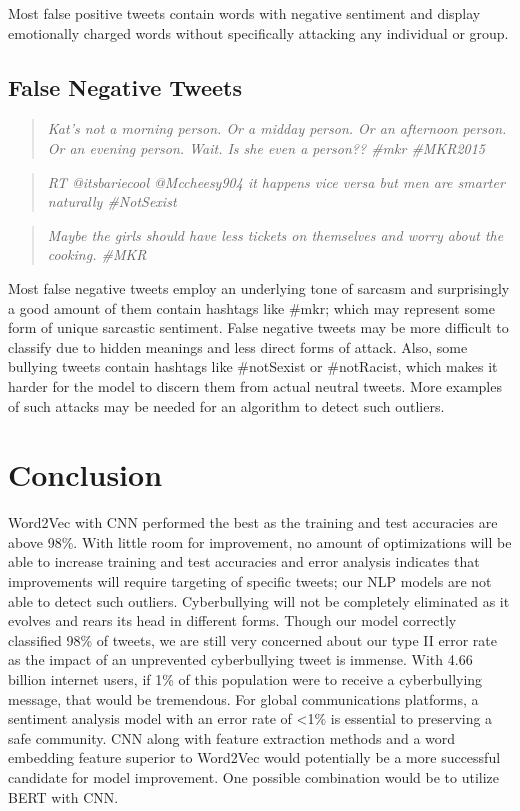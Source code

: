 \documentclass[conference]{IEEEtran}
\begin{document}
Most false positive tweets contain words with negative sentiment and display emotionally charged words without specifically attacking any individual or group.

\subsection{False Negative Tweets}
\begin{quotation}
\emph{Kat's not a morning person. Or a midday person. Or an afternoon person. Or an evening person. Wait. Is she even a person??  \#mkr \#MKR2015}
\end{quotation}
\begin{quotation}
\emph{RT @itsbariecool @Mccheesy904 it happens vice versa but men are smarter naturally \#NotSexist}
\end{quotation}
\begin{quotation}
\emph{Maybe the girls should have less tickets on themselves and worry about the cooking. \#MKR}
\end{quotation}

Most false negative tweets employ an underlying tone of sarcasm and surprisingly a good amount of them contain hashtags like \#mkr; which may represent some form of unique sarcastic sentiment. False negative tweets may be more difficult to classify due to hidden meanings and less direct forms of attack. Also, some bullying tweets contain hashtags like \#notSexist or \#notRacist, which makes it harder for the model to discern them from actual neutral tweets. More examples of such attacks may be needed for an algorithm to detect such outliers.

\section{Conclusion}

Word2Vec with CNN performed the best as the training and test accuracies are above 98\%. With little room for improvement, no amount of optimizations will be able to increase training and test accuracies and error analysis indicates that improvements will require targeting of specific tweets; our NLP models are not able to detect such outliers.
	Cyberbullying will not be completely eliminated as it evolves and rears its head in different forms. Though our model correctly classified 98\% of tweets, we are still very concerned about our type II error rate as the impact of an unprevented cyberbullying tweet is immense. With 4.66 billion internet users, if 1\% of this population were to receive a cyberbullying message, that would be tremendous. For global communications platforms, a sentiment analysis model with an error rate of  <1\% is essential to preserving a safe community. CNN along with feature extraction methods and a word embedding feature superior to Word2Vec would potentially be a more successful candidate for model improvement. One possible combination would be to utilize BERT with CNN.
\end{document}
